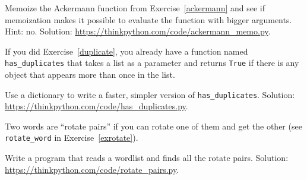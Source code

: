 \documentclass[10pt]{book}
\begin{document}
\begin{exercise}
Memoize the Ackermann function from Exercise~\ref{ackermann} and see if
memoization makes it possible to evaluate the function with bigger
arguments.  Hint: no.
Solution: \url{https://thinkpython.com/code/ackermann_memo.py}.

\end{exercise}



\begin{exercise}

If you did Exercise~\ref{duplicate}, you already have
a function named \verb"has_duplicates" that takes a list
as a parameter and returns {\tt True} if there is any object
that appears more than once in the list.

Use a dictionary to write a faster, simpler version of
\verb"has_duplicates".
Solution: \url{https://thinkpython.com/code/has_duplicates.py}.

\end{exercise}


\begin{exercise}
\label{exrotatepairs}

Two words are ``rotate pairs'' if you can rotate one of them
and get the other (see \verb"rotate_word" in Exercise~\ref{exrotate}).

Write a program that reads a wordlist and finds all the rotate
pairs.  Solution: \url{https://thinkpython.com/code/rotate_pairs.py}.

\end{exercise}
\end{document}
